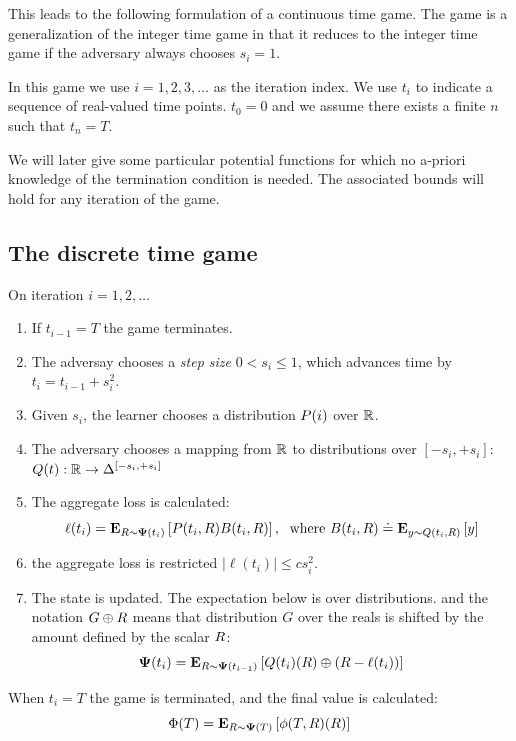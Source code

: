 \documentclass{article}[12pt]
\begin{document}
This leads to the following formulation of a continuous time game.
The game is a generalization of the integer time game in that it
reduces to the integer time game if the adversary always chooses $s_i=1$. 

In this game we use $i=1,2,3,\ldots$ as the iteration index. We use
$t_i$ to indicate a sequence of real-valued time points. $t_0=0$ and
we assume there exists a finite $n$ such that $t_n = T$.

We will later give some particular potential functions for which no
a-priori knowledge of the termination condition is needed. The
associated bounds will hold for any iteration of the game.

\subsection{The discrete time game}
\label{sec:discrete-Time-Game}

On iteration $i=1,2,\ldots$
\begin{enumerate}
\item  If $t_{i-1}=T$ the game terminates.
\item The adversay chooses a {\em step size} $0<s_i\leq 1$, which advances
  time by $t_i = t_{i-1}+s_i^2$.
\item Given $s_i$, the learner chooses a distribution $P(i)$ over $\mathbb{R}$.
\item The adversary chooses a mapping from $\mathbb{R}$ to distributions
  over $[-s_i,+s_i]$: $Q(t): \mathbb{R} \to \Delta^{[-s_i,+s_i]}$
\item The aggregate loss is calculated:
  \begin{equation} \label{eqn:ell-discrete}
    \ell(t_i)={\bf E}_{R \sim {\bf \Psi}(t_i)}\left[ P(t_i,R)
      B(t_i,R) \right],\;\mbox{ where } B(t_i,R) \doteq {\bf E}_{y \sim Q(t_i,R)}\left[ y \right]
  \end{equation}
\item the aggregate loss is restricted $|\ell(t_i)| \leq c s_i^2$.
\item The state is updated. The expectation below is over
  distributions. and the notation $G \oplus R$ means
  that distribution $G$ over the reals is shifted by the amount
  defined by the scalar $R$:
  $${\bf \Psi}(t_i) = {\bf E}_{R \sim {\bf \Psi}(t_{i-1})}\left[ Q(t_i)(R)\oplus (R-\ell(t_i)) \right]
  $$
\end{enumerate}

When $t_i=T$ the game is terminated, and the final value is calculated:
$$\Phi(T) ={\bf E}_{R \sim {\bf \Psi}(T)}\left[ \phi(T,R)(R) \right]$$
\end{document}
